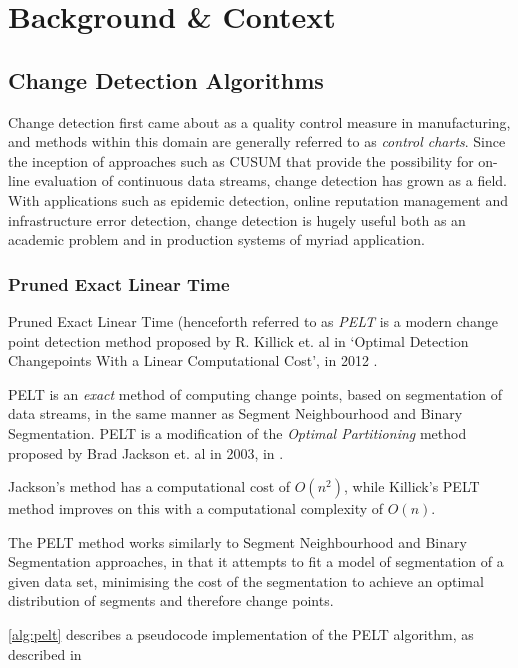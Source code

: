 \documentclass{uvamscse}	%
\begin{document}

\chapter{Background \& Context}

\section{Change Detection Algorithms}

Change detection first came about as a quality control measure in manufacturing, and methods within this domain are generally referred to as \emph{control charts}. Since the inception of approaches such as CUSUM that provide the possibility for on-line evaluation of continuous data streams, change detection has grown as a field. With applications such as epidemic detection, online reputation management and infrastructure error detection, change detection is hugely useful both as an academic problem and in production systems of myriad application.

\subsection{Pruned Exact Linear Time}

Pruned Exact Linear Time (henceforth referred to as \emph{PELT} is a modern change point detection method proposed by R. Killick et. al in `Optimal Detection Changepoints With a Linear Computational Cost', in 2012 \cite{Killick2011a}.

PELT is an \emph{exact} method of computing change points, based on segmentation of data streams, in the same manner as Segment Neighbourhood and Binary Segmentation. PELT is a modification of the \emph{Optimal Partitioning} method proposed by Brad Jackson et. al in 2003, in .

Jackson's method has a computational cost of $O(n^2)$, while Killick's PELT method improves on this with a computational complexity of $O(n)$.

The PELT method works similarly to Segment Neighbourhood and Binary Segmentation approaches, in that it attempts to fit a model of segmentation of a given data set, minimising the cost of the segmentation to achieve an optimal distribution of segments and therefore change points.

\autoref{alg:pelt} describes a pseudocode implementation of the PELT algorithm, as described in \cite{Eckley2011}\newline
\end{document}
